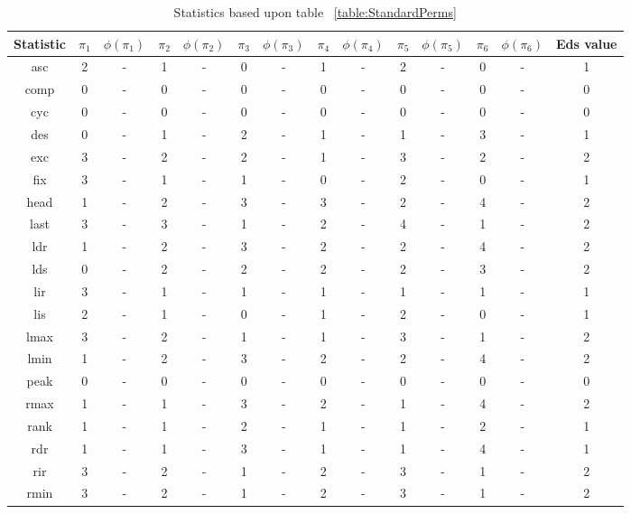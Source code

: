 \documentclass[12pt]{article}
\begin{document}
\begin{table}[H]
\caption{Statistics based upon table ~\ref{table:StandardPerms}}
\centering
\tabcolsep=0.11cm
\begin{tabular}{c | c c c c c c c c c c c c | c}
\hline\hline
Statistic & $\pi_1$ & $\phi(\pi_1)$ & $\pi_2$ & $\phi(\pi_2)$ & $\pi_3$ & $\phi(\pi_3)$ & $\pi_4$ & $\phi(\pi_4)$ & $\pi_5$ & $\phi(\pi_5)$ & $\pi_6$ & $\phi(\pi_6)$ & Eds value\\ [0.5ex]
\hline
asc & 2 & - & 1 & - & 0 & - & 1 & - & 2 & - & 0 & - & 1\\ 
comp & 0 & - & 0 & - & 0 & - & 0 & - & 0 & - & 0 & - & 0\\
cyc & 0 & - & 0 & - & 0 & - & 0 & - & 0 & - & 0 & - & 0\\
des & 0 & - & 1 & - & 2 & - & 1 & - & 1 & - & 3 & - & 1\\
exc & 3 & - & 2 & - & 2 & - & 1 & - & 3 & - & 2 & - & 2\\
fix & 3 & - & 1 & - & 1 & - & 0 & - & 2 & - & 0 & - & 1\\
head & 1 & - & 2 & - & 3 & - & 3 & - & 2 & - & 4 & - & 2\\
last & 3 & - & 3 & - & 1 & - & 2 & - & 4 & - & 1 & - & 2\\
ldr & 1 & - & 2 & - & 3 & - & 2 & - & 2 & - & 4 & - & 2\\
lds & 0 & - & 2 & - & 2 & - & 2 & - & 2 & - & 3 & - & 2\\
lir & 3 & - & 1 & - & 1 & - & 1 & - & 1 & - & 1 & - & 1\\
lis & 2 & - & 1 & - & 0 & - & 1 & - & 2 & - & 0 & - & 1\\
lmax & 3 & - & 2 & - & 1 & - & 1 & - & 3 & - & 1 & - & 2\\
lmin & 1 & - & 2 & - & 3 & - & 2 & - & 2 & - & 4 & - & 2\\
peak & 0 & - & 0 & - & 0 & - & 0 & - & 0 & - & 0 & - & 0\\
rmax & 1 & - & 1 & - & 3 & - & 2 & - & 1 & - & 4 & - & 2\\
rank & 1 & - & 1 & - & 2 & - & 1 & - & 1 & - & 2 & - & 1\\
rdr & 1 & - & 1 & - & 3 & - & 1 & - & 1 & - & 4 & - & 1\\
rir & 3 & - & 2 & - & 1 & - & 2 & - & 3 & - & 1 & - & 2\\
rmin & 3 & - & 2 & - & 1 & - & 2 & - & 3 & - & 1 & - & 2\\

\end{tabular}
\end{table}
\end{document}
